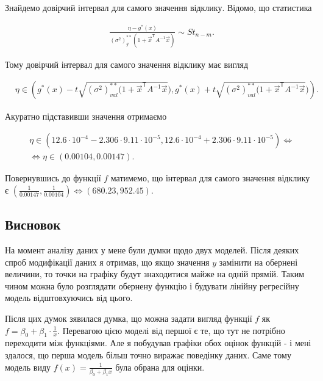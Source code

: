 \documentclass[14pt,a4paper]{scrartcl}
\theoremstyle{definition}
\theoremstyle{remark}
\theoremstyle{definition}
\theoremstyle{definition}
\begin{document}
Знайдемо довірчий інтервал для самого значення відклику. Відомо, що статистика

\begin{align*}
  & \frac{\eta - g^{*}(x)}{(\sigma^2)_{g}^{**} (1 + \vec{x}^\mathsf{T} A^{-1} \vec{x})} \sim St_{n - m}.
\end{align*}

Тому довірчий інтервал для самого значення відклику має вигляд

\begin{align*}
  & \eta \in \left( g^{*}(x) - t\sqrt{(\sigma^2)^{**}_{val} (1 + \vec{x}^\mathsf{T} A^{-1} \vec{x}}), g^{*}(x) + t\sqrt{(\sigma^2)^{**}_{val} (1 + \vec{x}^\mathsf{T} A^{-1} \vec{x}})  \right).
\end{align*}

Акуратно підставивши значення отримаємо

\begin{align*}
  & \eta \in \left( 12.6\cdot 10^{-4} - 2.306 \cdot 9.11\cdot 10^{-5}, 12.6\cdot 10^{-4} + 2.306 \cdot 9.11\cdot 10^{-5}  \right) \Leftrightarrow \\ & \Leftrightarrow \eta \in \left( 0.00104, 0.00147  \right).
\end{align*}

Повернувшись до функції $f$ матимемо, що інтервал для самого значення відклику є $(\frac{1}{0.00147}, \frac{1}{0.00104}) \Leftrightarrow (680.23, 952.45)$.

\subsection{Висновок}

На момент аналізу даних у мене були думки щодо двух моделей. Після деяких спроб модифікації даних я отримав, що якщо значення $y$ замінити на обернені величини, то точки на графіку будут знаходитися майже на одній прямій. Таким чином можна було розглядати обернену функцію і будувати лінійну регресійну модель відштовхуючись від цього.

Після цих думок з\textquotesingle явилася думка, що можна задати вигляд функції $f$ як $f = \beta_{0} + \beta_{1} \cdot \frac{1}{x}$. Перевагою цією моделі від першої є те, що тут не потрібно переходити між функціями. Але я побудував графіки обох оцінок функцій - і мені здалося, що перша модель більш точно виражає поведінку даних. Саме тому модель виду $f(x) = \frac{1}{\beta_{0} + \beta_{1} x}$ була обрана для оцінки.

\newpage
\end{document}
